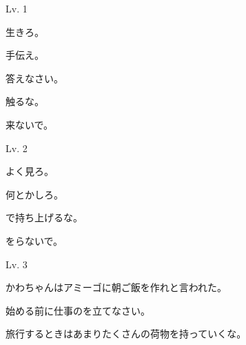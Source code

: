 
\author{Kristijan Čavić}

	
	\begin{mondai}{Lv. 1}
		\item 生きろ。
		\item 手伝え。
		\item 答えなさい。
		\item 触るな。
		\item 来ないで。
	\end{mondai}
	
	\begin{mondai}{Lv. 2}
		\item よく見ろ。
		\item 何とかしろ。
		\item {}で持ち上げるな。
		\item {}をらないで。
	\end{mondai}
	
	\begin{mondai}{Lv. 3}
		\item かわちゃんはアミーゴに朝ご飯を作れと言われた。
		\item 始める前に仕事のを立てなさい。
		\item 旅行するときはあまりたくさんの荷物を持っていくな。
	\end{mondai}
